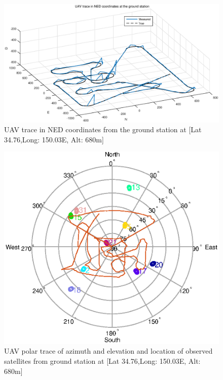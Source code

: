 \documentclass[Space3_Assign2]{subfile}
\begin{document}
\begin{figure}
\centering
\caption{UAV trace in NED coordinates from the ground station at [Lat 34.76\Deg,Long: 150.03\Deg E, Alt: 680m]}
\label{Q1BF1LG}
\includegraphics[width = \linewidth]{./Q1B_F1_LG.eps}
\end{figure}

\begin{figure}
\centering
\caption{UAV polar trace of azimuth and elevation and location of observed satellites from ground station at [Lat 34.76\Deg,Long: 150.03\Deg E, Alt: 680m]}
\label{Q1B_polartrack}
\includegraphics[width = \linewidth]{./Q1B_polartrack.eps}
\end{figure}
\end{document}

